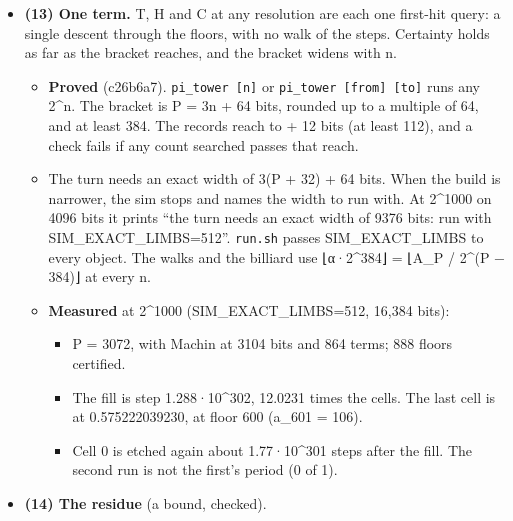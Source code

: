 \begin{itemize}
\item \textbf{(13) One term.} T, H and C at any resolution are each one first-hit query: a single descent through the floors, with no walk of the steps. Certainty holds as far as the bracket reaches, and the bracket widens with n.

\begin{itemize}
\item \textbf{Proved} (c26b6a7). \texttt{pi\_\allowbreak{}tower [n]} or \texttt{pi\_\allowbreak{}tower [from] [to]} runs any 2\textasciicircum{}n. The bracket is P = 3n + 64 bits, rounded up to a multiple of 64, and at least 384. The records reach to + 12 bits (at least 112), and a check fails if any count searched passes that reach.
\item The turn needs an exact width of 3(P + 32) + 64 bits. When the build is narrower, the sim stops and names the width to run with. At 2\textasciicircum{}1000 on 4096 bits it prints “the turn needs an exact width of 9376 bits: run with SIM\_\allowbreak{}EXACT\_\allowbreak{}LIMBS=512”. \texttt{run.\allowbreak{}sh} passes SIM\_\allowbreak{}EXACT\_\allowbreak{}LIMBS to every object. The walks and the billiard use ⌊α·2\textasciicircum{}384⌋ = ⌊A\_\allowbreak{}P / 2\textasciicircum{}(P − 384)⌋ at every n.
\item \textbf{Measured} at 2\textasciicircum{}1000 (SIM\_\allowbreak{}EXACT\_\allowbreak{}LIMBS=512, 16,384 bits):

\begin{itemize}
\item P = 3072, with Machin at 3104 bits and 864 terms; 888 floors certified.
\item The fill is step 1.288·10\textasciicircum{}302, 12.0231 times the cells. The last cell is at 0.575222039230, at floor 600 (a\_\allowbreak{}601 = 106).
\item Cell 0 is etched again about 1.77·10\textasciicircum{}301 steps after the fill. The second run is not the first's period (0 of 1).
\end{itemize}
\end{itemize}
\item \textbf{(14) The residue} (a bound, checked).


\end{itemize}
